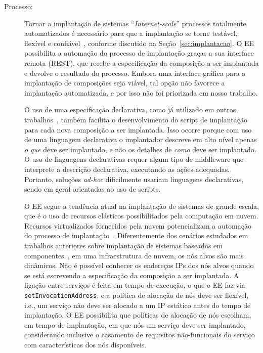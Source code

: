\begin{description}

\item [Processo:]

Tornar a implantação de sistemas ``\emph{Internet-scale}'' processos totalmente automatizados
é necessário para que a implantação se torne testável, flexível e confiável~\cite{Hamilton2007InternetScale},
conforme discutido na Seção~\ref{sec:implantacao}.
O EE possibilita a automação do processo de implantação
graças a sua interface remota (REST), que recebe a especificação
da composição a ser implantada e devolve o resultado do processo.
Embora uma interface gráfica para a implantação de composições seja viável,
tal opção não favorece a implantação automatizada,
e por isso não foi priorizada em nosso trabalho.

O uso de uma especificação declarativa,
como já utilizado em outros trabalhos~\cite{Balter1998Olan,Magee1996Dynamic},
também facilita o desenvolvimento do script de implantação
para cada nova composição a ser implantada.
Isso ocorre porque com uso de uma linguagem declarativa o implantador descreve em alto nível apenas
\emph{o que} deve ser implantado, e não os detalhes de \emph{como} deve ser implantado.
O uso de linguagens declarativas requer algum tipo de middleware que interprete
a descrição declarativa, executando as ações adequadas.
Portanto, soluções \emph{ad-hoc} dificilmente usariam linguagens declarativas,
sendo em geral orientadas ao uso de scripts.

O EE segue a tendência atual na implantação de sistemas de grande escala, que é o uso
de recursos elásticos possibilitados pela computação em nuvem.
Recursos virtualizados fornecidos pela nuvem potencializam
a automação do processo de implantação~\cite{Humble2011Continuous}.
Diferentemente dos cenários estudados em trabalhos anteriores sobre
implantação de sistemas baseados em componentes~\cite{Balter1998Olan,Magee1996Dynamic},
em uma infraestrutura de nuvem, os nós alvos são mais dinâmicos. 
Não é possível conhecer os endereços IPs
dos nós alvos quando se está escrevendo a especificação da composição a ser implantada.
A ligação entre serviços é feita em tempo de execução, o que o EE faz via \texttt{setInvocationAddress},
e a política de alocação de nós deve ser flexível, i.e.,
um serviço não deve ser alocado a um IP estático antes do tempo de implantação.
O EE possibilita que políticas de alocação de nós
escolham, em tempo de implantação, em que nós um serviço deve ser implantado,
considerando inclusive o casamento de requisitos não-funcionais do serviço
com características dos nós disponíveis.


\end{description}

